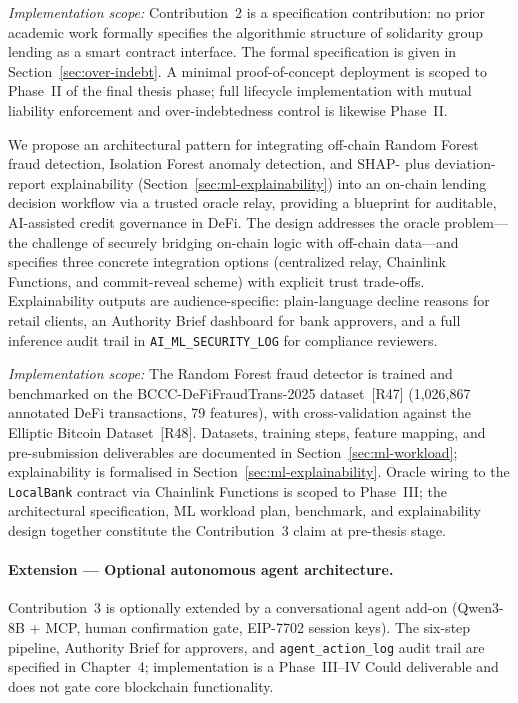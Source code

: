 \documentclass[12pt,a4paper]{report}
\begin{document}
\begin{description}[leftmargin=0pt]
\textit{Implementation scope:} Contribution~2 is a specification contribution: no prior academic work formally specifies the algorithmic structure of solidarity group lending as a smart contract interface. The formal specification is given in Section~\ref{sec:over-indebt}. A minimal proof-of-concept deployment is scoped to Phase~II of the final thesis phase; full lifecycle implementation with mutual liability enforcement and over-indebtedness control is likewise Phase~II.

\item[\textbf{Contribution 3 --- Oracle-Mediated AI/ML Integration with Explainability.}]
We propose an architectural pattern for integrating off-chain Random Forest fraud detection, Isolation Forest anomaly detection, and SHAP- plus deviation-report explainability (Section~\ref{sec:ml-explainability}) into an on-chain lending decision workflow via a trusted oracle relay, providing a blueprint for auditable, AI-assisted credit governance in DeFi. The design addresses the oracle problem---the challenge of securely bridging on-chain logic with off-chain data---and specifies three concrete integration options (centralized relay, Chainlink Functions, and commit-reveal scheme) with explicit trust trade-offs. Explainability outputs are audience-specific: plain-language decline reasons for retail clients, an Authority Brief dashboard for bank approvers, and a full inference audit trail in \texttt{AI\_ML\_SECURITY\_LOG} for compliance reviewers.

\textit{Implementation scope:} The Random Forest fraud detector is trained and benchmarked on the BCCC-DeFiFraudTrans-2025 dataset~[R47] (1,026,867 annotated DeFi transactions, 79 features), with cross-validation against the Elliptic Bitcoin Dataset~[R48]. Datasets, training steps, feature mapping, and pre-submission deliverables are documented in Section~\ref{sec:ml-workload}; explainability is formalised in Section~\ref{sec:ml-explainability}. Oracle wiring to the \texttt{LocalBank} contract via Chainlink Functions is scoped to Phase~III; the architectural specification, ML workload plan, benchmark, and explainability design together constitute the Contribution~3 claim at pre-thesis stage.

\paragraph{Extension --- Optional autonomous agent architecture.}
Contribution~3 is optionally extended by a conversational agent add-on (Qwen3-8B + MCP, human confirmation gate, EIP-7702 session keys). The six-step pipeline, Authority Brief for approvers, and \texttt{agent\_action\_log} audit trail are specified in Chapter~4; implementation is a Phase~III--IV Could deliverable and does not gate core blockchain functionality.


\end{description}
\end{document}
